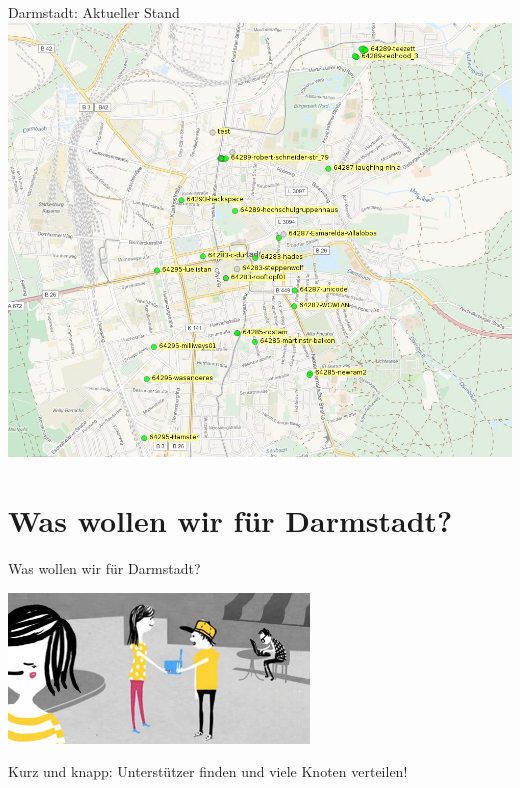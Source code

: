 \documentclass{beamer}
\begin{document}
\begin{frame}{Darmstadt: Aktueller Stand}
\vfill
\centering
\includegraphics[height=0.85\textheight]{images/darmstadt-map}
\vfill
\end{frame}

\section{Was wollen wir für Darmstadt?}
\begin{frame}{Was wollen wir für Darmstadt?}
\begin{center}
\vfill
\includegraphics[width=0.6\textwidth]{images/router}
\end{center}

\vfill
Kurz und knapp: Unterstützer finden und viele Knoten verteilen!
\vfill
\end{frame}
\end{document}
